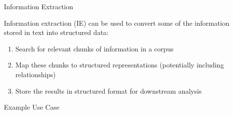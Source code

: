 \documentclass[10pt]{beamer}
\begin{document}
\begin{frame}{Information Extraction}

Information extraction (IE) can be used to convert some of the information stored in text into \alert{structured data}:

\begin{enumerate}
   \item Search for relevant chunks of information in a corpus
   \item Map these chunks to structured representations (potentially including relationships)
   \item Store the results in structured format for downstream analysis
\end{enumerate}

\begin{center}
\end{center}

\end{frame}
\begin{frame}{Example Use Case}
  \begin{center}
  \end{center}
\end{frame}
\end{document}

